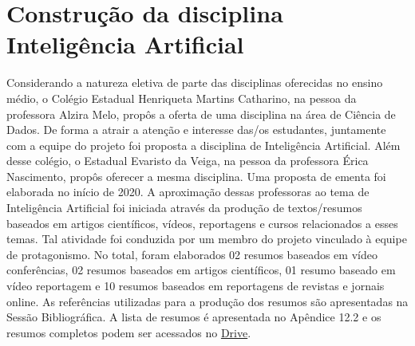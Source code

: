 \documentclass[
]{book}
\begin{document}
\hypertarget{construuxe7uxe3o-da-disciplina-inteliguxeancia-artificial}{%
\section{Construção da disciplina Inteligência Artificial}\label{construuxe7uxe3o-da-disciplina-inteliguxeancia-artificial}}

Considerando a natureza eletiva de parte das disciplinas oferecidas no ensino médio, o Colégio Estadual Henriqueta Martins Catharino, na pessoa da professora Alzira Melo, propôs a oferta de uma disciplina na área de Ciência de Dados. De forma a atrair a atenção e interesse das/os estudantes, juntamente com a equipe do projeto foi proposta a disciplina de Inteligência Artificial. Além desse colégio, o Estadual Evaristo da Veiga, na pessoa da professora Érica Nascimento, propôs oferecer a mesma disciplina. Uma proposta de ementa foi elaborada no início de 2020.
A aproximação dessas professoras ao tema de Inteligência Artificial foi iniciada através da produção de textos/resumos baseados em artigos científicos, vídeos, reportagens e cursos relacionados a esses temas. Tal atividade foi conduzida por um membro do projeto vinculado à equipe de protagonismo. No total, foram elaborados 02 resumos baseados em vídeo conferências, 02 resumos baseados em artigos científicos, 01 resumo baseado em vídeo reportagem e 10 resumos baseados em reportagens de revistas e jornais online. As referências utilizadas para a produção dos resumos são apresentadas na Sessão Bibliográfica. A lista de resumos é apresentada no Apêndice 12.2 e os resumos completos podem ser acessados no \href{https://drive.google.com/drive/folders/1J2h6ljxDrwNOSu66Wzr-V13JCXEHWzHv?usp=sharin}{Drive}.
\end{document}
